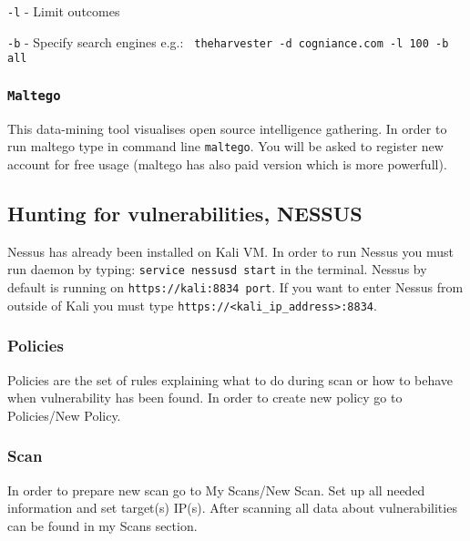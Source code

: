 \documentclass{article}[12pt]
\begin{document}
\texttt{-l} - Limit outcomes
\newline

\texttt{-b} - Specify search engines e.g.: \texttt{ theharvester -d cogniance.com -l 100 -b all }

\subsubsection*{\texttt{Maltego}}
This data-mining tool visualises open source intelligence gathering. In order to run maltego type in
command line \texttt{maltego}. You will be asked to register new account for free usage (maltego has also paid version
which is more powerfull).

\subsubsection*{\texttt{}}




\subsection{Hunting for vulnerabilities, NESSUS}

Nessus has already been installed on Kali VM. In order to run Nessus you must run daemon by typing: \texttt{service nessusd start} in the terminal. Nessus by default is running on \texttt{https://kali:8834 port}. If you want to enter Nessus
from outside of Kali you must type \texttt{https://<kali\_ip\_address>:8834}.

\subsubsection*{Policies}

Policies are the set of rules explaining what to do during scan or how to behave when vulnerability has been found. In order to create new policy go to Policies/New Policy.

\subsubsection*{Scan}

In order to prepare new scan go to My Scans/New Scan. Set up all needed information and set target(s) IP(s). After scanning all data about vulnerabilities can be found in my Scans section.
\end{document}
